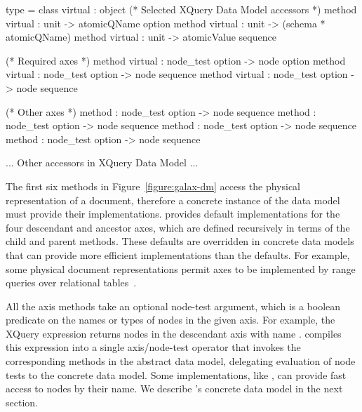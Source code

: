 \begin{figure*}
\begin{small}
\begin{code}
type  = 
class virtual  : 
object
  (* Selected XQuery Data Model accessors *)
  method virtual    : unit -> atomicQName option
  method virtual         : unit -> (schema * atomicQName)
  method virtual  : unit -> atomicValue sequence

  (* Required axes *)
  method virtual       : node_test option -> node option
  method virtual        : node_test option -> node sequence
  method virtual    : node_test option -> node sequence

  (* Other axes *)
  method   : node_test option -> node sequence
  method           : node_test option -> node sequence
  method     : node_test option -> node sequence
  method             : node_test option -> node sequence

  ... Other accessors in XQuery Data Model ...
\end{code}
\end{small}
\caption{Signatures for methods in Galax's abstract node interface}
\label{figure:galax-dm}
\end{figure*}

The first six methods in Figure~\ref{figure:galax-dm} access the
physical representation of a document, therefore a concrete instance
of the data model must provide their implementations.  \Galax{}
provides default implementations for the four {descendant} and
ancestor axes, which are defined recursively in terms of the {child}
and {parent} methods.  These defaults are overridden in concrete data
models that can provide more efficient implementations than the
defaults.  For example, some physical document representations permit
axes to be implemented by range queries over relational
tables~\cite{grust03staircase}.

All the axis methods take an optional node-test argument, which is a
boolean predicate on the names or types of nodes in the given axis.
For example, the XQuery expression  returns
nodes in the descendant axis with name .  \Galax{} compiles
this expression into a single axis/node-test operator that invokes the
corresponding methods in the abstract data model, delegating
evaluation of node tests to the concrete data model.  Some
implementations, like \padx{}, can provide fast access to nodes by
their name.  We describe \padx{}'s concrete data model in the next
section.

